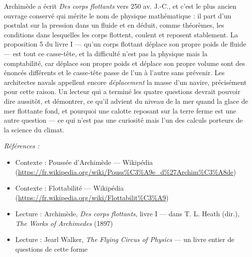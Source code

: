 \documentclass[11pt]{article}
\newenvironment{refs}{\par\small\noindent\emph{Références :}\begin{itemize}\setlength\itemsep{0pt}}{\end{itemize}\normalsize}
\begin{document}
\noindent Archimède a écrit \textit{Des corps flottants} vers 250 av. J.-C., et c'est
le plus ancien ouvrage conservé qui mérite le nom de physique mathématique : il part d'un
postulat sur la pression dans un fluide et en déduit, comme théorèmes, les conditions dans
lesquelles les corps flottent, coulent et reposent stablement. La proposition 5 du livre I ---
qu'un corps flottant déplace son propre poids de fluide --- est tout ce casse-tête, et la
difficulté n'est pas la physique mais la comptabilité, car \og{} déplace son propre poids \fg{} et
\og{} déplace son propre volume \fg{} sont des énoncés différents et le casse-tête passe de l'un à
l'autre sans prévenir. Les architectes navals appellent encore \textit{déplacement} la masse
d'un navire, précisément pour cette raison. Un lecteur qui a terminé les quatre questions
devrait pouvoir dire aussitôt, et démontrer, ce qu'il advient du niveau de la mer quand la
glace de mer flottante fond, et pourquoi une calotte reposant sur la terre ferme est une
autre question --- ce qui n'est pas une curiosité mais l'un des calculs porteurs de la science
du climat.

\begin{refs}
\item Contexte : Poussée d'Archimède --- Wikipédia (\url{https://fr.wikipedia.org/wiki/Pouss%C3%A9e_d%27Archim%C3%A8de})
\item Contexte : Flottabilité --- Wikipédia (\url{https://fr.wikipedia.org/wiki/Flottabilit%C3%A9})
\item Lecture : Archimède, \textit{Des corps flottants}, livre I --- dans T. L. Heath (dir.), \textit{The Works of Archimedes} (1897)
\item Lecture : Jearl Walker, \textit{The Flying Circus of Physics} --- un livre entier de questions de cette forme
\end{refs}

\bigskip
\end{document}

